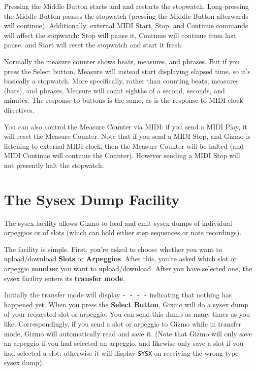 \documentclass{article}
\begin{document}
	Pressing the Middle Button starts and and restarts the stopwatch.  Long-pressing the Middle Button pauses the stopwatch (pressing the Middle Button afterwards will continue).  Additionally, external MIDI Start, Stop, and Continue commands will affect the stopwatch: Stop will pause it, Continue will continue from last pause, and Start will reset the stopwatch and start it fresh.

	Normally the measure counter shows beats, measures, and phrases.  But if you press the Select button, Measure will instead start displaying elapsed time, so it's basically a stopwatch.  More specifically, rather than counting beats, measures (bars), and phrases, Measure will count eighths of a second, seconds, and minutes.  The response to buttons is the same, as is the response to MIDI clock directives.

	You can also control the Measure Counter via MIDI: if you send a MIDI Play, it will reset the Measure Counter.  Note that if you send a MIDI Stop, and Gizmo is listening to external MIDI clock, then the Measure Counter will be halted (and MIDI Continue will continue the Counter).  However sending a MIDI Stop will not presently halt the stopwatch.

\clearpage

\section {The Sysex Dump Facility}
\label{sysex}

	The sysex facility allows Gizmo to load and emit sysex dumps of individual arpeggios or of slots (which can hold either step sequences or note recordings).
	
	The facility is simple.  First, you're asked to choose whether you want to upload/download {\bf Slots} or {\bf Arpeggios}.  After this, you're asked which slot or arpeggio {\bf number} you want to upload/download.  After you have selected one, the sysex facility enters its {\bf transfer mode}.
	
Initially the transfer mode will display \texttt{-~-~-~-} indicating that nothing has happened yet.  When you press the {\bf Select Button}, Gizmo will do a sysex dump of your requested slot or arpeggio.  You can send this dump as many times as you like.  Correspondingly, if you send a slot or arpeggio to Gizmo while in transfer mode, Gizmo will automatically read and save it.  (Note that Gizmo will only save an arpeggio if you had selected an arpeggio, and likewise only save a slot if you had selected a slot: otherwise it will display \texttt{SYSX} on receiving the wrong type sysex dump).
\end{document}
